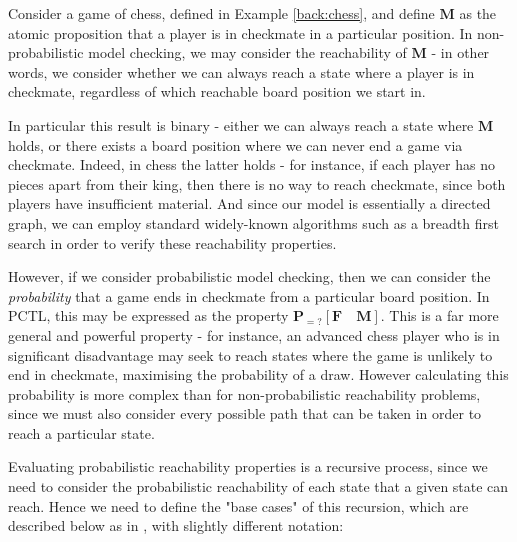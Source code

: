 \begin{example}
\label{back:chess-reachability}
    Consider a game of chess, defined in Example \ref{back:chess}, and define $\mathbf{M}$ as the atomic proposition that a player is in checkmate in a particular position. In non-probabilistic model checking, we may consider the reachability of $\mathbf{M}$ - in other words, we consider whether we can always reach a state where a player is in checkmate, regardless of which reachable board position we start in.
    
    In particular this result is binary - either we can always reach a state where $\mathbf{M}$ holds, or there exists a board position where we can never end a game via checkmate. Indeed, in chess the latter holds - for instance, if each player has no pieces apart from their king, then there is no way to reach checkmate, since both players have insufficient material. And since our model is essentially a directed graph, we can employ standard widely-known algorithms such as a breadth first search in order to verify these reachability properties.

    However, if we consider probabilistic model checking, then we can consider the \emph{probability} that a game ends in checkmate from a particular board position. In PCTL, this may be expressed as the property $\mathbf{P}_{=?} [\mathbf{F} \quad \mathbf{M}]$. This is a far more general and powerful property - for instance, an advanced chess player who is in significant disadvantage may seek to reach states where the game is unlikely to end in checkmate, maximising the probability of a draw. However calculating this probability is more complex than for non-probabilistic reachability problems, since we must also consider every possible path that can be taken in order to reach a particular state.

\end{example}

Evaluating probabilistic reachability properties is a recursive process, since we need to consider the probabilistic reachability of each state that a given state can reach. Hence we need to define the "base cases" of this recursion, which are described below as in \cite{kwiatkowska_stochastic_2007}, with slightly different notation:

